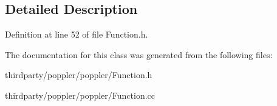 \subsection{Detailed Description}


Definition at line 52 of file Function.\+h.



The documentation for this class was generated from the following files\+:\begin{DoxyCompactItemize}
\item 
thirdparty/poppler/poppler/Function.\+h\item 
thirdparty/poppler/poppler/Function.\+cc\end{DoxyCompactItemize}
